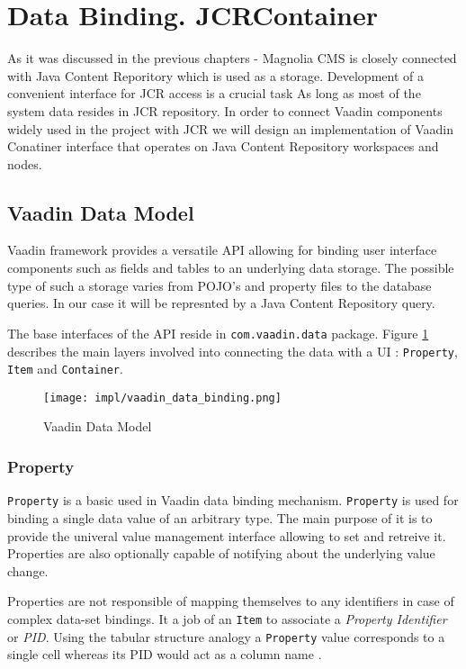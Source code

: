 \section{Data Binding. JCRContainer}
As it was discussed in the previous chapters - Magnolia CMS is closely connected
with Java Content Reporitory which is used as a storage. Development of a
convenient interface for JCR access is a crucial task As long as most of the
system data resides in JCR repository. In order to connect Vaadin components
widely used in the project with JCR we will design an implementation of Vaadin
Conatiner interface that operates on Java Content Repository workspaces and nodes.

\subsection{Vaadin Data Model}

Vaadin framework provides a versatile API allowing for binding user interface
components such as fields and tables to an underlying data storage. The possible
type of such a storage varies from POJO's and property files to the database
queries. In our case it will be represnted by a Java Content Repository query.

The base interfaces of the API reside in \texttt{com.vaadin.data} package.
Figure \ref{fig:vaadin_data_binding} describes the main layers involved into
connecting the data with a UI \cite{vaadin_data_model}:
\texttt{Property}, \texttt{Item} and \texttt{Container}.

\begin{figure}[H]
	\centering
	\texttt{[image: impl/vaadin\_data\_binding.png]}
	\caption{Vaadin Data Model}
	\label{fig:vaadin_data_binding}
\end{figure}

\subsubsection{Property}
\texttt{Property} is a basic used in Vaadin data binding mechanism.
\texttt{Property} is used for binding a single data value of an
arbitrary type. The main purpose of it is to provide the univeral value management 
interface allowing to set and retreive it. Properties are also optionally
capable of notifying about the underlying value change\cite{vaadin_data_model}.

Properties are not responsible of mapping themselves to any identifiers in case
of complex data-set bindings. It a job of an \texttt{Item} to associate a
\emph{Property Identifier} or \emph{PID}. Using the tabular structure analogy a
\texttt{Property} value corresponds to a single cell whereas its PID would act
as a column name \cite{vaadin_data_model}.

